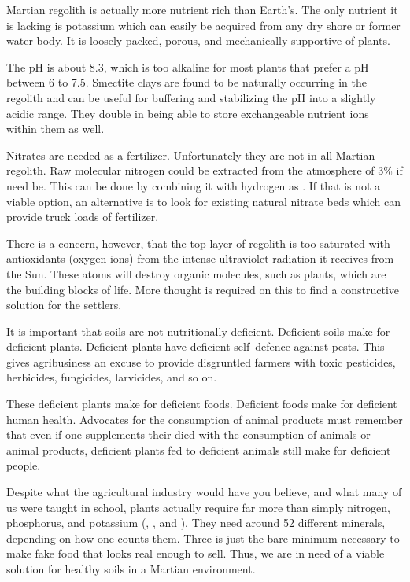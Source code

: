 Martian regolith is actually more nutrient rich than Earth's. The only nutrient it is lacking is potassium which can easily be acquired from any dry shore or former water body. It is loosely packed, porous, and mechanically supportive of plants.

The pH is about 8.3, which is too alkaline for most plants that prefer a pH between 6 to 7.5. Smectite clays are found to be naturally occurring in the regolith and can be useful for buffering and stabilizing the pH into a slightly acidic range. They double in being able to store exchangeable nutrient ions within them as well.

Nitrates are needed as a fertilizer. Unfortunately they are not in all Martian regolith. Raw molecular nitrogen could be extracted from the atmosphere of 3\% if need be. This can be done by combining it with hydrogen as . If that is not a viable option, an alternative is to look for existing natural nitrate beds which can provide truck loads of fertilizer.

There is a concern, however, that the top layer of regolith is too saturated with antioxidants (oxygen ions) from the intense ultraviolet radiation it receives from the Sun. These atoms will destroy organic molecules, such as plants, which are the building blocks of life. More thought is required on this to find a constructive solution for the settlers.

It is important that soils are not nutritionally deficient. Deficient soils make for deficient plants. Deficient plants have deficient self--defence against pests. This gives agribusiness an excuse to provide disgruntled farmers with toxic pesticides, herbicides, fungicides, larvicides, and so on. 

These deficient plants make for deficient foods. Deficient foods make for deficient human health. Advocates for the consumption of animal products must remember that even if one supplements their died with the consumption of animals or animal products, deficient plants fed to deficient animals still make for deficient people.

Despite what the agricultural industry would have you believe, and what many of us were taught in school, plants actually require far more than simply nitrogen, phosphorus, and potassium (, , and ). They need around 52 different minerals, depending on how one counts them. Three is just the bare minimum necessary to make fake food that looks real enough to sell. Thus, we are in need of a viable solution for healthy soils in a Martian environment.

